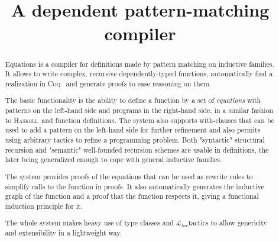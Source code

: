 \documentclass[9pt]{sigplanconf}
\title{\Equations\\
  A dependent pattern-matching compiler}
\def\name#1{\textsc{#1}~}
\def\Coq{\name{Coq}}
\def\Haskell{\name{Haskell}}
\def\text#1{#1}
\def\Ltac{$\mathcal{\text{L}}_{\text{tac}}$}
\begin{document}
\maketitle

\begin{abstract}
  Equations is a compiler for definitions made by pattern matching on
  inductive families. It allows to write complex, recursive
  dependently-typed functions, automatically find a realization in \Coq 
  and generate proofs to ease reasoning on them.

  The basic functionality is the ability to define a function by a set
  of \textit{equations} with patterns on the left-hand side and programs
  in the right-hand side, in a similar fashion to \Haskell and \Agda
  function definitions. The system also supports with-clauses that can
  be used to add a pattern on the left-hand side for further refinement
  and also permits using arbitrary tactics to refine a programming
  problem. Both "syntactic" structural recursion and "semantic" well-founded 
  recursion schemes are usable in definitions, the later being
  generalized enough to cope with general inductive families.
  
  The system provides proofs of the equations that can be used as
  rewrite rules to simplify calls to the function in proofs. It also
  automatically generates the inductive graph of the function and a
  proof that the function respects it, giving a functional induction
  principle for it. 
  
  The whole system makes heavy use of type classes and \Ltac tactics to
  allow genericity and extensibility in a lightweight way.
\end{abstract}



  


\end{document}
